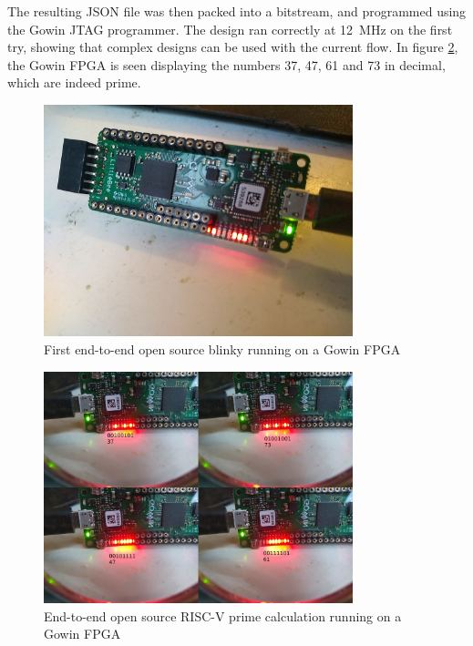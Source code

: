 \documentclass{article}
\begin{document}
The resulting JSON file was then packed into a bitstream, and programmed using the Gowin JTAG programmer. The design ran correctly at \SI{12}{\mega\hertz} on the first try, showing that complex designs can be used with the current flow. In figure \ref{fig:riscprime}, the Gowin FPGA is seen displaying the numbers 37, 47, 61 and 73 in decimal, which are indeed prime.

\begin{figure}
    \centering
    \includegraphics[width=0.8\textwidth]{fig/blinky.jpg}
    \caption{First end-to-end open source blinky running on a Gowin FPGA}
    \label{fig:trenzblinky}
\end{figure}

\begin{figure}
    \centering
    \includegraphics[width=0.8\textwidth]{fig/primes.jpg}
    \caption{End-to-end open source RISC-V prime calculation running on a Gowin FPGA}
    \label{fig:riscprime}
\end{figure}
\end{document}
